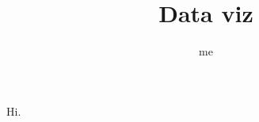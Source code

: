 \documentclass{article}
\title{Data viz}
\author{me}
\begin{document}
\maketitle

Hi.
\end{document}
